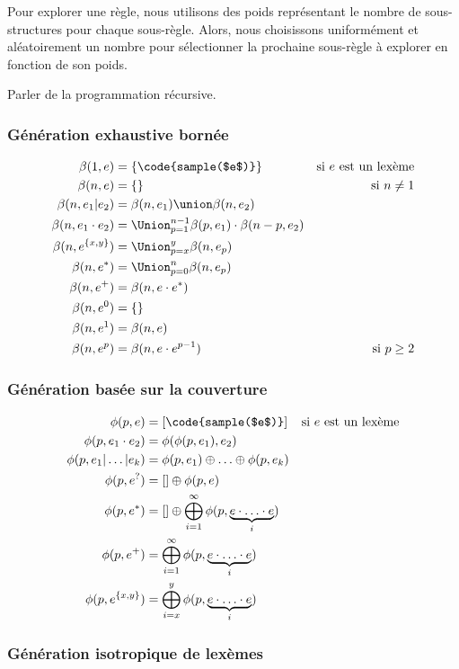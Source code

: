 Pour explorer une règle, nous utilisons des poids représentant le nombre de
sous-structures pour chaque sous-règle. Alors, nous choisissons uniformément et
aléatoirement un nombre pour sélectionner la prochaine sous-règle à explorer en
fonction de son poids.


Parler de la programmation récursive.

\subsubsection{Génération exhaustive bornée}
\label{subsection:data:bounded_exhaustive_generation}

\begin{align*}
%
\beta(1, e) & =
    \{\code{sample($e$)}\}
    &
    \text{si $e$ est un lexème}
    \\
%
\beta(n, e) & =
    \{\}
    &
    \text{si $n \neq 1$}
    \\
%
\beta(n, e_1 \vert e_2) & =
    \beta(n, e_1) \union \beta(n, e_2)
    \\
%
\beta(n, e_1 \cdot e_2) & =
    \Union_{p = 1}^{n - 1}
    \beta(p, e_1) \cdot \beta(n - p, e_2)
    \\
%
\beta(n, e^{\{x, y\}}) & =
    \Union_{p = x}^y \beta(n, e_p)
    \\
%
\beta(n, e^*) & =
    \Union_{p = 0}^n \beta(n, e_p)
    \\
%
\beta(n, e^+) & =
    \beta(n, e \cdot e^*)
    \\
%
\beta(n, e^0) & =
    \{\}
    \\
%
\beta(n, e^1) & =
    \beta(n, e)
    \\
%
\beta(n, e^p) & =
    \beta(n, e \cdot e^{p - 1})
    &
    \text{si $p \geq 2$}
%
\end{align*}

\subsubsection{Génération basée sur la couverture}
\label{subsection:data:coverage_based_generation}

\begin{align*}
%
\phi(p, e) & =
    [\code{sample($e$)}]
    &
    \text{si $e$ est un lexème}
    \\
%
\phi(p, e_1 \cdot e_2) & =
    \phi(\phi(p, e_1), e_2)
    \\
%
\phi(p, e_1 \vert \dotso \vert e_k) & =
    \phi(p, e_1) \oplus \dotso \oplus \phi(p, e_k)
    \\
%
\phi(p, e^?) & =
    [] \oplus \phi(p, e)
    \\
%
\phi(p, e^*) & =
    [] \oplus \bigoplus_{i = 1}^\infty
    \phi(p, \underbrace{e \cdot \dotso \cdot e}_i)
    \\
%
\phi(p, e^+) & =
    \bigoplus_{i = 1}^\infty \phi(p, \underbrace{e \cdot \dotso \cdot e}_i)
    \\
%
\phi(p, e^{\{x, y\}}) & =
    \bigoplus_{i = x}^y \phi(p, \underbrace{e \cdot \dotso \cdot e}_i)
%
\end{align*}

\subsubsection{Génération isotropique de lexèmes}
\label{subsection:data:isotropic_generation}
